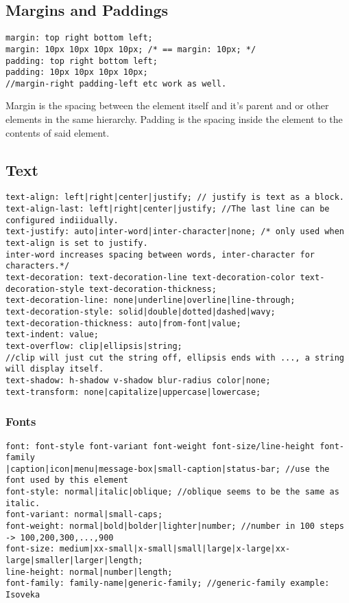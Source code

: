 \documentclass[main.tex,fontsize=6pt,paper=a4,paper=landscape,DIV=calc,]{scrartcl}
\begin{document}
\begin{multicols*}{4}
\subsection{Margins and Paddings}
\vspace{-2mm}
\begin{lstlisting}
margin: top right bottom left;
margin: 10px 10px 10px 10px; /* == margin: 10px; */
padding: top right bottom left;
padding: 10px 10px 10px 10px;
//margin-right padding-left etc work as well.
\end{lstlisting}
\vspace{2mm}
Margin is the spacing between the element itself and it's parent and or other elements in the same hierarchy.\newline
Padding is the spacing inside the element to the contents of said element.

\subsection{Text}

\vspace{-2mm}
\begin{lstlisting}
text-align: left|right|center|justify; // justify is text as a block.
text-align-last: left|right|center|justify; //The last line can be configured indiidually.
text-justify: auto|inter-word|inter-character|none; /* only used when text-align is set to justify.
inter-word increases spacing between words, inter-character for characters.*/
text-decoration: text-decoration-line text-decoration-color text-decoration-style text-decoration-thickness;
text-decoration-line: none|underline|overline|line-through;
text-decoration-style: solid|double|dotted|dashed|wavy;
text-decoration-thickness: auto|from-font|value;
text-indent: value;
text-overflow: clip|ellipsis|string; 
//clip will just cut the string off, ellipsis ends with ..., a string will display itself.
text-shadow: h-shadow v-shadow blur-radius color|none;
text-transform: none|capitalize|uppercase|lowercase;
\end{lstlisting}
\vspace{2mm}

\subsubsection{Fonts}
\vspace{-2mm}
\begin{lstlisting}
font: font-style font-variant font-weight font-size/line-height font-family
|caption|icon|menu|message-box|small-caption|status-bar; //use the font used by this element
font-style: normal|italic|oblique; //oblique seems to be the same as italic.
font-variant: normal|small-caps;
font-weight: normal|bold|bolder|lighter|number; //number in 100 steps -> 100,200,300,...,900
font-size: medium|xx-small|x-small|small|large|x-large|xx-large|smaller|larger|length;
line-height: normal|number|length;
font-family: family-name|generic-family; //generic-family example: Isoveka
\end{lstlisting}
\vspace{2mm}


\end{multicols*}
\end{document}

